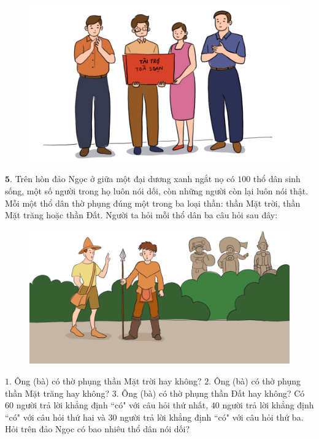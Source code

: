 \begin{multicols}{2}
\begin{figure}[H]
		\captionsetup{labelformat= empty, justification=centering}
		\includegraphics[width=1\linewidth]{Hinh4}
		\vspace*{-20pt}
	\end{figure}
	\vskip 0.1cm
	$\pmb{5.}$ 	Trên hòn đảo Ngọc ở giữa một đại dương xanh ngắt nọ có $100$ thổ dân sinh sống, một số người trong họ luôn nói dối, còn những người còn lại luôn nói thật. Mỗi một thổ dân thờ phụng đúng một trong ba loại thần: thần Mặt trời, thần Mặt trăng hoặc thần Đất. Người ta hỏi mỗi thổ dân ba câu hỏi sau đây:
	\begin{figure}[H]
		\centering
		\vspace*{-5pt}
		\captionsetup{labelformat= empty, justification=centering}
		\includegraphics[width=1\linewidth]{Hinh5}
		\vspace*{-15pt}
	\end{figure}
	$1.$ Ông (bà) có thờ phụng thần Mặt trời hay không?
	\vskip 0.1cm
	$2.$ Ông (bà) có thờ phụng thần Mặt trăng hay không?
	\vskip 0.1cm
	$3.$ Ông (bà) có thờ phụng thần Đất hay không?
	\vskip 0.1cm
	Có $60$ người trả lời khẳng định ``có" với câu hỏi thứ nhất, $40$ người trả lời khẳng định ``có" với câu hỏi thứ hai và $30$ người trả lời khẳng định ``có" với câu hỏi thứ ba. Hỏi trên đảo Ngọc có bao nhiêu thổ dân nói dối?

\end{multicols}
